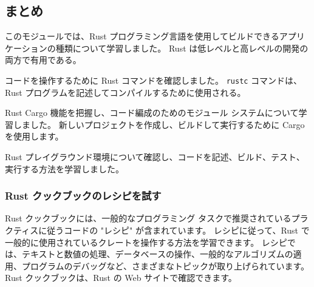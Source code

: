\subsection{まとめ}


このモジュールでは、Rust プログラミング言語を使用してビルドできるアプリケーションの種類について学習しました。 Rust は低レベルと高レベルの開発の両方で有用である。

コードを操作するために Rust コマンドを確認しました。 \texttt{rustc} コマンドは、Rust プログラムを記述してコンパイルするために使用される。

Rust Cargo 機能を把握し、コード編成のためのモジュール システムについて学習しました。 新しいプロジェクトを作成し、ビルドして実行するために Cargo を使用します。

Rust プレイグラウンド環境について確認し、コードを記述、ビルド、テスト、実行する方法を学習しました。

\subsubsection{Rust クックブックのレシピを試す}

Rust クックブックには、一般的なプログラミング タスクで推奨されているプラクティスに従うコードの "レシピ" が含まれています。 レシピに従って、Rust で一般的に使用されているクレートを操作する方法を学習できます。 レシピでは、テキストと数値の処理、データベースの操作、一般的なアルゴリズムの適用、プログラムのデバッグなど、さまざまなトピックが取り上げられています。 Rust クックブックは、Rust の Web サイトで確認できます。